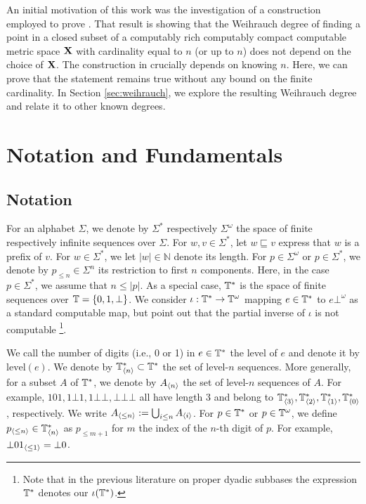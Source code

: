 \documentclass{eptcs-modified}
\begin{document}
An initial motivation of this work was the investigation of a construction employed to prove \cite[Proposition 1.9]{paulyleroux}. That result is showing that the Weihrauch degree of finding a point in a closed subset of a computably rich computably compact computable metric space $\mathbf{X}$ with cardinality equal to $n$ (or up to $n$) does not depend on the choice of $\mathbf{X}$. The construction in \cite{paulyleroux} crucially depends on knowing $n$. Here, we can prove that the statement remains true without any bound on the finite cardinality. In Section \ref{sec:weihrauch}, we explore the resulting Weihrauch degree and relate it to other known degrees.

\section{Notation and Fundamentals}

\subsection{Notation}\label{section-notation}
For an alphabet $\Sigma$, we denote by $\Sigma^*$ respectively $\Sigma^\omega$ the space of
finite respectively infinite sequences over $\Sigma$.
For $w, v \in \Sigma^*$, let $w \sqsubseteq v$ express that $w$ is a prefix of $v$.
For $w \in \Sigma^*$, we let $|w| \in \mathbb{N}$ denote its length.
For $p \in {\Sigma}^\omega$ or $p \in {\Sigma}^*$, we denote by $p_{\leq n} \in {\Sigma}^n$ its restriction to first $n$ components.  Here, in the case $p \in {\Sigma}^*$, we assume that $n \leq |p|$.
As a special case, $\mathbb{T}^*$ is the space of finite sequences over $\mathbb{T}=\{0,1,\bot\}$.
We consider $\iota : \mathbb{T}^* \to \mathbb{T}^\omega$ mapping $e \in \mathbb{T}^*$ to $e\bot^\omega$ as a standard computable map, but point out that the partial inverse of $\iota$ is not computable
\footnote{Note that in the previous literature on proper dyadic subbases the expression $\mathbb{T}^*$ denotes our
$\iota(\mathbb{T}^*)$.}.

We call the number of digits (i.e., 0 or 1) in  $e \in \mathbb{T}^*$ the level of $e$
and denote it by $\mathrm{level}(e)$.
We denote by ${{\mathbb{T}^*_{{\langle n\rangle}}}} \subset \mathbb{T}^*$ the set of level-$n$ sequences.
More generally, for a subset $A$ of $\mathbb{T}^*$,
we denote by ${{A_{{\langle n\rangle}}}}$ the set of level-$n$ sequences of $A$.
For example,
$1 0 1, 1 \bot 1, 1\bot\bot, \bot\bot\bot$ all have length 3 and
belong to ${{{\mathbb{T}^*_{{\langle3\rangle}}}}}, {{{\mathbb{T}^*_{{\langle2\rangle}}}}}, {{{\mathbb{T}^*_{{\langle1\rangle}}}}}, {{{\mathbb{T}^*_{{\langle0\rangle}}}}}$, respectively.
We write ${{A_{{\langle\leq n\rangle}}}} := \bigcup_{i \leq n} {{A_{{\langle i\rangle}}}}$.
For $p \in \mathbb{T}^*$ or $p \in \mathbb{T}^\omega$, we define ${{p_{{\langle\leq n\rangle}}}} \in {{\mathbb{T}^*_{{\langle n\rangle}}}}$ as
$p_{\leq m+1}$
for $m$ the index of the $n$-th digit of $p$. For example, ${{\bot 01_{{\langle\leq 1\rangle}}}} = \bot0$.
\end{document}
